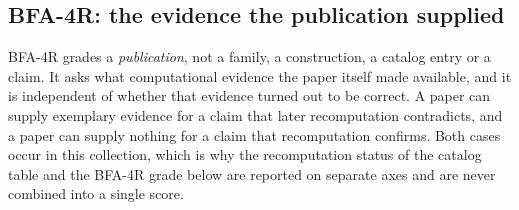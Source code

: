 %
%
%

\providecommand{\gball}{}
\DeclareRobustCommand{\gball}[1]{%
  \begin{tikzpicture}[baseline=-0.55ex,scale=0.85]
    \draw[line width=0.4pt] (0,0) circle (0.52ex);
    \ifnum#1>0 \fill (0,0) -- (90:0.52ex) arc (90:{90-180*#1}:0.52ex) -- cycle; \fi
  \end{tikzpicture}}
\providecommand{\gf}{}\DeclareRobustCommand{\gf}{\gball{2}}  %
\providecommand{\gh}{}\DeclareRobustCommand{\gh}{\gball{1}}  %
\providecommand{\go}{}\DeclareRobustCommand{\go}{\gball{0}}  %

\subsection*{BFA-4R: the evidence the publication supplied}

BFA-4R grades a \emph{publication}, not a family, a construction, a catalog
entry or a claim. It asks what computational evidence the paper itself made
available, and it is independent of whether that evidence turned out to be
correct. A paper can supply exemplary evidence for a claim that later
recomputation contradicts, and a paper can supply nothing for a claim that
recomputation confirms. Both cases occur in this collection, which is why the
recomputation status of the catalog table and the BFA-4R grade below are
reported on separate axes and are never combined into a single score.

